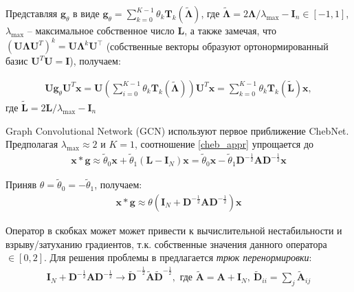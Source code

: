 \documentclass[12pt,twosides]{article}
\begin{document}
	Представляя $\mathbf{g}_{\theta}$ в виде $\mathbf{g}_{\theta}=\sum_{k=0}^{K-1} \theta_{k} \mathbf{T}_{k}\mathbf{(\tilde{\Lambda})}$, где $\mathbf{\tilde{\Lambda}} = 2 \mathbf{\Lambda} / \lambda_{\max }-\mathbf{I}_{n} \in[-1,1]$, $\lambda_{\max }$ -- максимальное собственное число $\mathbf{L}$, а также замечая, что $\left(\mathbf{U} \mathbf{\Lambda} \mathbf{U}^{T}\right)^{k}=\mathbf{U} \mathbf{\Lambda}^{k} \mathbf{U}^{\top}$ (собственные векторы образуют ортонормированный базис $\mathbf{U}^{T}\mathbf{U}=\mathbf{I}$), получаем:
	
	\begin{align}
		\mathbf{U g}_{\theta} \mathbf{U}^{T} \mathbf{x}=\mathbf{U}\left(\sum_{i=0}^{K-1} \theta_{k} \mathbf{T}_{k}(\tilde{\mathbf{\Lambda}})\right) \mathbf{U}^{T} \mathbf{x} = \sum_{k=0}^{K-1} \theta_{k} \mathbf{T}_{k}(\tilde{\mathbf{L}}) \mathbf{x},
		\label{cheb_appr}
	\end{align}
	где $\tilde{\mathbf{L}}=2 \mathbf{L} / \lambda_{\max }-\mathbf{I}_{n}$
	
	Graph Convolutional Network (GCN) \cite{kipf_semi-supervised_2017} используют первое приближение ChebNet. Предполагая $\lambda_{\max} \approx 2$ и $K=1$, соотношение \ref{cheb_appr} упрощается до 
	\begin{align}
	\mathbf{x} * \mathbf{g} \approx \tilde{\theta}_{0} \mathbf{x}+\tilde{\theta}_{1}\left(\mathbf{L}-\mathbf{I}_{N}\right) \mathbf{x}=\tilde{\theta}_{0} \mathbf{x}-\tilde{\theta}_{1} \mathbf{D}^{-\frac{1}{2}} \mathbf{A} \mathbf{D}^{-\frac{1}{2}} \mathbf{x}
	\end{align}
	
	Приняв $\theta = \tilde{\theta}_0  = -\tilde{\theta}_1$, получаем:
	\begin{align}
	\mathbf{x} * \mathbf{g}  \approx \theta\left(\mathbf{I}_{N}+\mathbf{D}^{-\frac{1}{2}} \mathbf{A} \mathbf{D}^{-\frac{1}{2}}\right) \mathbf{x}
	\label{conv}
	\end{align}
	
	Оператор в скобках может может привести к вычислительной нестабильности и взрыву/затуханию градиентов, т.к. собственные значения данного оператора $\in [0,2]$. Для решения проблемы в \cite{kipf_semi-supervised_2017} предлагается \textit{трюк перенормировки}: 
	\begin{align*}
	\mathbf{I}_{N}+\mathbf{D}^{-\frac{1}{2}} \mathbf{A} \mathbf{D}^{-\frac{1}{2}} \rightarrow
	\tilde{\mathbf{D}}^{-\frac{1}{2}} \tilde{\mathbf{A}}\tilde{\mathbf{D}}^{-\frac{1}{2}}, 
	\text{ где }
	\tilde{\mathbf{A}}=\mathbf{A}+\mathbf{I}_{N},~ \tilde{\mathbf{D}}_{i i}=\sum_{j} \tilde{\mathbf{A}}_{i j}
	\end{align*}
\end{document}
